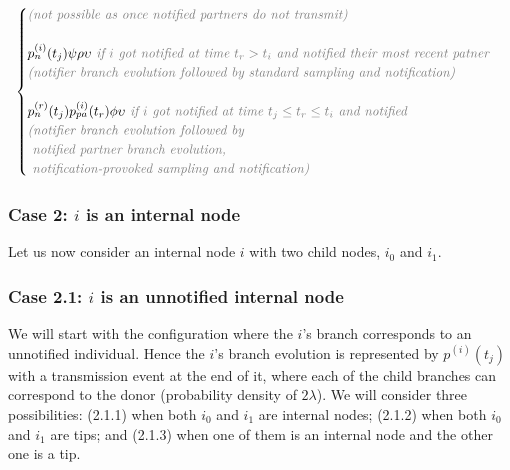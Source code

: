 \documentclass[a4paper,10pt]{article}
\begin{document}
\begin{equation}
\begin{array}{ll}
\begin{cases}
\textit{\color{gray} (not possible as once notified partners do not transmit)}\\
\\
p_n^{(i)}(t_j)\psi\rho\upsilon \textit{\color{gray} ~if $i$ got notified at time $t_r > t_i$ and notified their most recent patner}\\
\textit{\color{gray} (notifier branch evolution followed by standard sampling and  notification)}\\
\\
p_n^{(r)}(t_j) p_{pa}^{(i)}(t_r) \phi \upsilon \textit{\color{gray} ~if $i$ got notified at time $t_j \leq t_r \leq t_i$ and notified}\\
\textit{\color{gray} (notifier branch evolution followed by} \\
\textit{\color{gray}~notified partner branch evolution,} \\
\textit{\color{gray}~notification-provoked sampling and notification)}\\
\end{cases}\\
\end{array}
\label{eq:tip}
\end{equation}

\subsubsection*{Case 2: $i$ is an internal node} 
Let us now consider an internal node $i$ with two child nodes, $i_0$ and $i_1$. 

\subsubsection*{Case 2.1: $i$ is an unnotified internal node} 
We will start with the configuration where the $i$'s branch corresponds to an unnotified individual. Hence the $i$'s branch evolution is represented by $p^{(i)}(t_j)$ with a transmission event at the end of it, where each of the child branches can correspond to the donor (probability density of $2\lambda$). We will consider three possibilities: (2.1.1) when both $i_0$ and $i_1$ are internal nodes; (2.1.2) when both $i_0$ and $i_1$ are tips; and (2.1.3) when one of them is an internal node and the other one is a tip.

\end{document}
